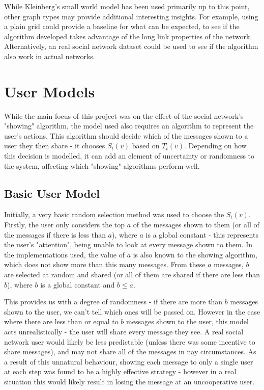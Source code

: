 \documentclass[bsc,frontabs,twoside,singlespacing,parskip,deptreport]{infthesis}     %
\begin{document}
While Kleinberg's small world model has been used primarily up to this point, other graph types may provide additional interesting insights. For example, using a plain grid could provide a baseline for what can be expected, to see if the algorithm developed takes advantage of the long link properties of the network. Alternatively, an real social network dataset could be used to see if the algorithm also work in actual networks.

\section{User Models} \label{sec:user_models}
While the main focus of this project was on the effect of the social network's "showing" algorithm, the model used also requires an algorithm to represent the user's actions. This algorithm should decide which of the messages shown to a user they then share - it chooses $S_{t}(v)$ based on $T_{t}(v)$. Depending on how this decision is modelled, it can add an element of uncertainty or randomness to the system, affecting which "showing" algorithms perform well.

\subsection{Basic User Model}
Initially, a very basic random selection method was used to choose the $S_{t}(v)$. Firstly, the user only considers the top $a$ of the messages shown to them (or all of the messages if there is less than $a$), where $a$ is a global constant - this represents the user's "attention", being unable to look at every message shown to them. In the implementations used, the value of $a$ is also known to the showing algorithm, which does not show more than this many messages. From these $a$ messages, $b$ are selected at random and shared (or all of them are shared if there are less than $b$), where $b$ is a global constant and $b \le a$.

This provides us with a degree of randomness - if there are more than $b$ messages shown to the user, we can't tell which ones will be passed on. However in the case where there are less than or equal to $b$ messages shown to the user, this model acts unrealistically - the user will share every message they see. A real social network user would likely be less predictable (unless there was some incentive to share messages), and may not share all of the messages in nay circumstances. As a result of this unnatural behaviour, showing each message to only a single user at each step was found to be a highly effective strategy - however in a real situation this would likely result in losing the message at an uncooperative user.
\end{document}
